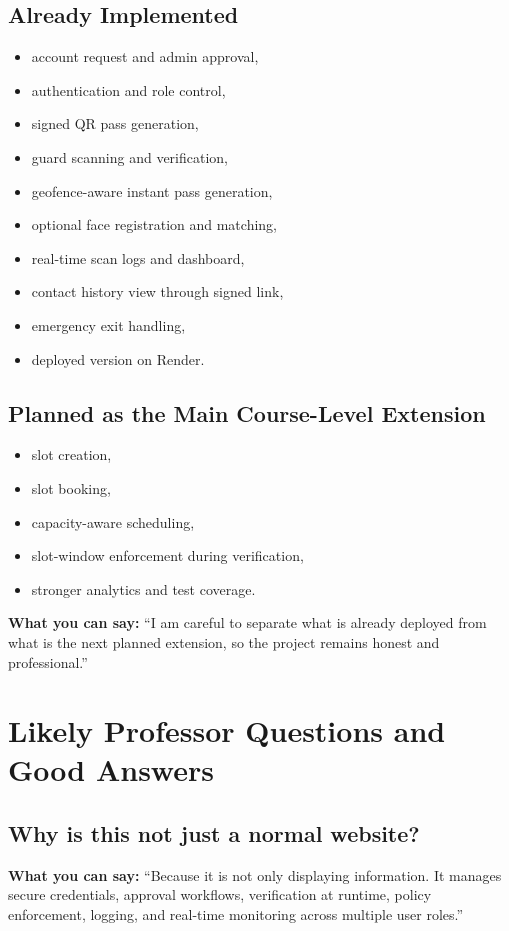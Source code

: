\documentclass[12pt,letterpaper]{article}
\newcommand{\say}[1]{\textbf{What you can say:} ``#1''}
\begin{document}
\subsection{Already Implemented}

\begin{itemize}
    \item account request and admin approval,
    \item authentication and role control,
    \item signed QR pass generation,
    \item guard scanning and verification,
    \item geofence-aware instant pass generation,
    \item optional face registration and matching,
    \item real-time scan logs and dashboard,
    \item contact history view through signed link,
    \item emergency exit handling,
    \item deployed version on Render.
\end{itemize}

\subsection{Planned as the Main Course-Level Extension}

\begin{itemize}
    \item slot creation,
    \item slot booking,
    \item capacity-aware scheduling,
    \item slot-window enforcement during verification,
    \item stronger analytics and test coverage.
\end{itemize}

\say{I am careful to separate what is already deployed from what is the next planned extension, so the project remains honest and professional.}

\section{Likely Professor Questions and Good Answers}

\subsection{Why is this not just a normal website?}
\say{Because it is not only displaying information. It manages secure credentials, approval workflows, verification at runtime, policy enforcement, logging, and real-time monitoring across multiple user roles.}
\end{document}
